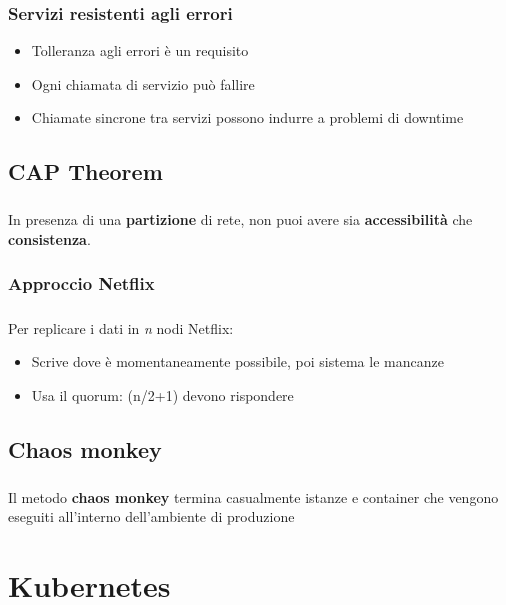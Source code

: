 \documentclass[a4paper, 12pt]{report}
\begin{document}
          \subsection{Servizi resistenti agli errori}
          \begin{itemize}
            \item Tolleranza agli errori è un requisito
            \item Ogni chiamata di servizio può fallire 
            \item Chiamate sincrone tra servizi possono indurre a problemi di downtime
          \end{itemize}
        \section{CAP Theorem}
        \paragraph{}In presenza di una \textbf{partizione} di rete, non puoi avere sia \textbf{accessibilità} che \textbf{consistenza}.
        \subsection{Approccio Netflix}
        \paragraph{}Per replicare i dati in \textit{n} nodi Netflix:
        \begin{itemize}
          \item Scrive dove è momentaneamente possibile, poi sistema le mancanze
          \item Usa il quorum: (n/2+1) devono rispondere
        \end{itemize}
        \section{Chaos monkey}
        \paragraph{}Il metodo \textbf{chaos monkey} termina casualmente istanze e container che vengono eseguiti all'interno dell'ambiente di produzione
      \chapter{Kubernetes}
\end{document}
